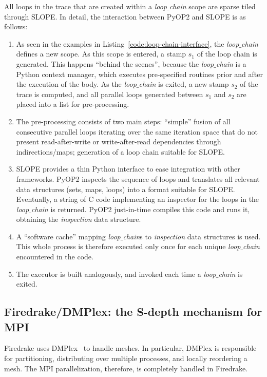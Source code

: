 All loops in the trace that are created within a {\em loop$\_$chain} scope are sparse tiled through SLOPE. In detail, the interaction between PyOP2 and SLOPE is as follows:
\begin{enumerate}
\item As seen in the examples in Listing~\ref{code:loop-chain-interface}, the {\em loop$\_$chain} defines a new scope. As this scope is entered, a stamp $s_1$ of the loop chain is generated. This happens ``behind the scenes'', because the {\em loop$\_$chain} is a Python context manager, which executes pre-specified routines prior and after the execution of the body. As the {\em loop$\_$chain} is exited, a new stamp $s_2$ of the trace is computed, and all parallel loops generated between $s_1$ and $s_2$ are placed into a list for pre-processing.
\item The pre-processing consists of two main steps: ``simple'' fusion of all consecutive parallel loops iterating over the same iteration space that do not present read-after-write or write-after-read dependencies through indirections/maps; generation of a loop chain suitable for SLOPE.
\item SLOPE provides a thin Python interface to ease integration with other frameworks. PyOP2 inspects the sequence of loops and translates all relevant data structures (sets, maps, loops) into a format suitable for SLOPE. Eventually, a string of C code implementing an inspector for the loops in the {\em loop$\_$chain} is returned. PyOP2 just-in-time compiles this code and runs it, obtaining the {\em inspection} data structure.
\item A ``software cache'' mapping {\em loop$\_$chain}s to {\em inspection} data structures is used. This whole process is therefore executed only once for each unique {\em loop$\_$chain} encountered in the code. 
\item The executor is built analogously, and invoked each time a {\em loop$\_$chain} is exited.
\end{enumerate}

\subsection{Firedrake/DMPlex: the S-depth mechanism for MPI}
\label{sec:tiling:impl-firedrake}
Firedrake uses DMPlex~\citep{dmplex-cite} to handle meshes. In particular, DMPlex is responsible for partitioning, distributing over multiple processes, and locally reordering a mesh. The MPI parallelization, therefore, is completely handled in Firedrake.

